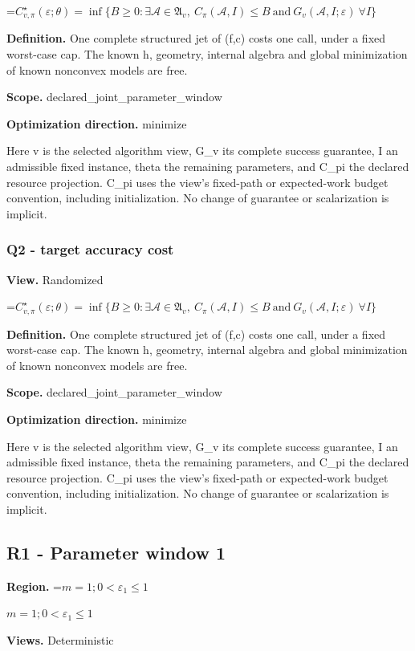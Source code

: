 \documentclass[10pt,a4paper]{article}
\newcommand{\AtlasMath}[1]{\par\begingroup\centering\setbox0=\hbox{$\displaystyle #1$}\ifdim\wd0>1.4\linewidth\typeout{ATLAS WIDE FORMULA: \the\wd0}\fi\ifdim\wd0>\linewidth\resizebox{\linewidth}{!}{\box0}\else\box0\fi\par\endgroup}
\newcommand{\AtlasInlineMath}[1]{\begingroup\setbox0=\hbox{$#1$}\ifdim\wd0>.4\linewidth\endgroup\AtlasMath{#1}\else\endgroup$#1$\fi}
\begin{document}
\AtlasMath{C^\star_{v,\pi}(\varepsilon;\theta)=\inf\{B\ge0:\exists\mathcal A\in\mathfrak A_v,\ C_\pi(\mathcal A,I)\le B\ \text{and}\ G_v(\mathcal A,I;\varepsilon)\ \forall I\}}
\textbf{Definition.} One complete structured jet of (f,c) costs one call, under a fixed worst-case cap. The known h, geometry, internal algebra and global minimization of known nonconvex models are free.

\textbf{Scope.} declared\_joint\_parameter\_window

\textbf{Optimization direction.} minimize

Here v is the selected algorithm view, G\_v its complete success guarantee, I an admissible fixed instance, theta the remaining parameters, and C\_pi the declared resource projection. C\_pi uses the view's fixed-path or expected-work budget convention, including initialization. No change of guarantee or scalarization is implicit.

\subsubsection{Q2 - target accuracy cost}
\textbf{View.} Randomized

\AtlasMath{C^\star_{v,\pi}(\varepsilon;\theta)=\inf\{B\ge0:\exists\mathcal A\in\mathfrak A_v,\ C_\pi(\mathcal A,I)\le B\ \text{and}\ G_v(\mathcal A,I;\varepsilon)\ \forall I\}}
\textbf{Definition.} One complete structured jet of (f,c) costs one call, under a fixed worst-case cap. The known h, geometry, internal algebra and global minimization of known nonconvex models are free.

\textbf{Scope.} declared\_joint\_parameter\_window

\textbf{Optimization direction.} minimize

Here v is the selected algorithm view, G\_v its complete success guarantee, I an admissible fixed instance, theta the remaining parameters, and C\_pi the declared resource projection. C\_pi uses the view's fixed-path or expected-work budget convention, including initialization. No change of guarantee or scalarization is implicit.

\subsection{R1 - Parameter window 1}
\textbf{Region.} \AtlasInlineMath{m=1;0<\varepsilon_1\le 1}

\textbf{Views.} Deterministic
\end{document}
